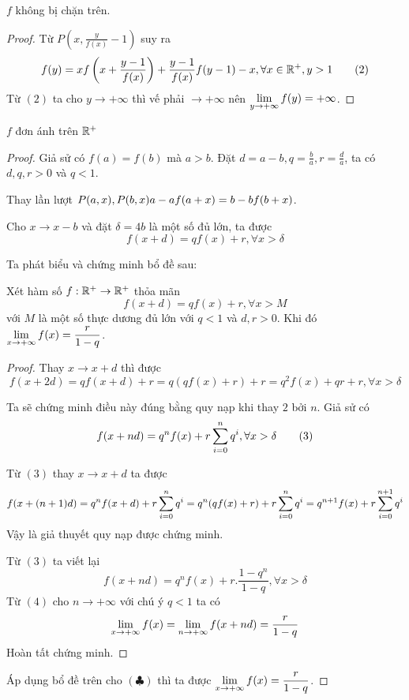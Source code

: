 \documentclass[11pt]{scrartcl}
\begin{document}
\begin{itemize}[label=, leftmargin=0em, itemsep=0.5em]
\begin{sol}
    
        

         $f$ không bị chặn trên.
        \begin{proof}
            Từ $P\left(x,\frac{y}{f(x)} - 1\right)$ suy ra \[f(y) = xf\left(x + \frac{y-1}{f(x)}\right) + \frac{y - 1}{f(x)}f(y - 1) - x,\xro, y > 1 \tag{2}
            \]
            Từ $(2)$ ta cho $y \to +\infty$ thì vế phải $\to +\infty$ nên $\displaystyle\lim_{y \to +\infty} f(y) = +\infty$.
        \end{proof}

         $f$ đơn ánh trên $\mathbb{R^+}$
        \begin{proof}
            Giả sử có $f(a)=f(b)$ mà $a > b$. Đặt $d = a - b,q = \frac{b}{a}, r= \frac{d}{a}$, ta có $d,q,r > 0$ và $q < 1$.
        
            Thay lần lượt $P(a,x),P(b,x) \ra a - af(a + x) = b - bf(b + x)$. 

            Cho $x \to x -b$ và đặt $\delta = 4b$ là một số đủ lớn, ta được 
            \[
                f(x + d) = qf(x) + r, \forall x > \delta \tag{$\clubsuit$ }
            \]

            Ta phát biểu và chứng minh bổ đề sau:
            \begin{lemma}
                Xét hàm số $f: \mathbb{R^+} \to \mathbb{R^+}$ thỏa mãn 
                \[
                    f(x + d) = qf(x) + r, \forall x > M
                \]
                với $M$ là một số thực dương đủ lớn với $q < 1$ và $d,r > 0$. Khi đó $\blim_{x \to +\infty} f(x) = \frac{r}{1 - q}$.
            \end{lemma}
            \begin{proof}
            Thay $x \to x + d$ thì được \[f(x + 2d) = qf(x + d) + r = q(qf(x) + r) +r = q^2f(x) + qr + r, \forall x > \delta\]

            Ta sẽ chứng minh điều này đúng bằng quy nạp khi thay $2$ bởi $n$. Giả sử có \[f(x + nd) = q^nf(x) + r\displaystyle\sum_{i = 0}^n q^i, \forall x > \delta\tag{3}\]

            Từ $(3)$ thay $x \to x + d$ ta được 
            \[
                f(x + (n + 1)d) = q^nf(x + d) + r\displaystyle\sum_{i = 0}^n q^i = q^n(qf(x) +r) +  r\displaystyle\sum_{i = 0}^n q^i = q^{n + 1}f(x) +  r\displaystyle\sum_{i = 0}^{n + 1} q^i
            \]
            Vậy là giả thuyết quy nạp được chứng minh.

            Từ $(3)$ ta viết lại 
            \[
                f(x + nd) = q^nf(x) + r.\frac{1 - q^{n}}{1 - q}, \forall x > \delta \tag{4}
            \]
            Từ $(4)$ cho $n \to +\infty$ với chú ý $q < 1$ ta có 
            \[
                \lim_{x \to +\infty} f(x) = \dlim f(x + nd) = \frac{r}{1 - q}
            \]
            Hoàn tất chứng minh.
            \end{proof}
            Áp dụng bổ đề trên cho $(\clubsuit)$ thì ta được $\blim_{x \to +\infty} f(x) = \frac{r}{1 - q}$.


\end{proof}
\end{sol}
\end{itemize}
\end{document}
